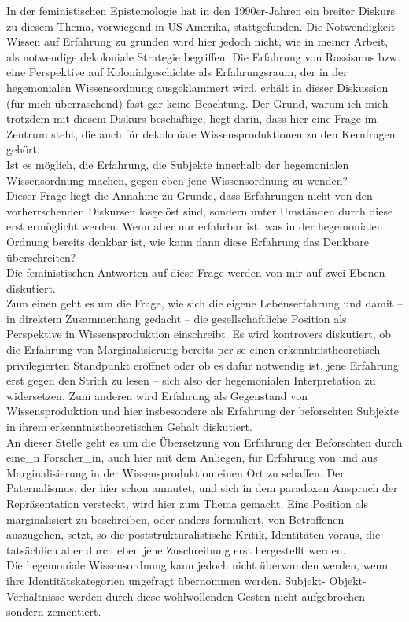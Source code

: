 In der feministischen Epistemologie hat in den 1990er-Jahren ein breiter Diskurs
zu diesem Thema, vorwiegend in US-Amerika, stattgefunden. Die Notwendigkeit
Wissen auf Erfahrung zu gründen wird hier jedoch nicht, wie in meiner Arbeit,
als notwendige dekoloniale Strategie begriffen. Die Erfahrung von Rassismus bzw.
eine Perspektive auf Kolonialgeschichte als Erfahrungsraum, der in der
hegemonialen Wissensordnung ausgeklammert wird, erhält in dieser Diskussion (für
mich überraschend) fast gar keine Beachtung. Der Grund, warum ich mich trotzdem
mit diesem Diskurs beschäftige, liegt darin, dass hier eine Frage im Zentrum
steht, die auch für dekoloniale Wissensproduktionen zu den Kernfragen gehört:
\\
Ist es möglich, die Erfahrung, die Subjekte innerhalb der hegemonialen
Wissensordnung machen, gegen eben jene Wissensordnung zu wenden?
\\
Dieser Frage
liegt die Annahme zu Grunde, dass Erfahrungen nicht von den vorherrschenden
Diskursen losgelöst sind, sondern unter Umständen durch diese erst ermöglicht
werden. Wenn aber nur erfahrbar ist, was in der hegemonialen Ordnung bereits
denkbar ist, wie kann dann diese Erfahrung das Denkbare überschreiten?
\\
Die
feministischen Antworten auf diese Frage werden von mir auf zwei Ebenen
diskutiert. \\
Zum einen geht es um die Frage, wie sich die eigene Lebenserfahrung
und damit – in direktem Zusammenhang gedacht – die gesellschaftliche Position
als Perspektive in Wissensproduktion einschreibt. Es wird kontrovers diskutiert,
ob die Erfahrung von Marginalisierung bereits per se einen erkenntnistheoretisch
privilegierten Standpunkt eröffnet oder ob es dafür notwendig ist, jene
Erfahrung erst gegen den Strich zu lesen – sich also der hegemonialen
Interpretation zu widersetzen. Zum anderen wird Erfahrung als Gegenstand von
Wissensproduktion und hier insbesondere als Erfahrung der beforschten Subjekte
in ihrem erkenntnistheoretischen Gehalt diskutiert. \\
An dieser Stelle geht es um
die Übersetzung von Erfahrung der Beforschten durch eine\_n Forscher\_in, auch
hier mit dem Anliegen, für Erfahrung von und aus Marginalisierung in der
Wissensproduktion einen Ort zu schaffen. Der Paternalismus, der hier schon
anmutet, und sich in dem paradoxen Anspruch der Repräsentation versteckt, wird
hier zum Thema gemacht. Eine Position als marginalisiert zu beschreiben, oder
anders formuliert, von Betroffenen auszugehen, setzt, so die
poststrukturalistische Kritik, Identitäten voraus, die tatsächlich aber durch
eben jene Zuschreibung erst hergestellt werden. \\
Die hegemoniale Wissensordnung
kann jedoch nicht überwunden werden, wenn ihre Identitätskategorien ungefragt
übernommen werden. Subjekt- Objekt-Verhältnisse werden durch diese wohlwollenden
Gesten nicht aufgebrochen sondern zementiert. 
\\

